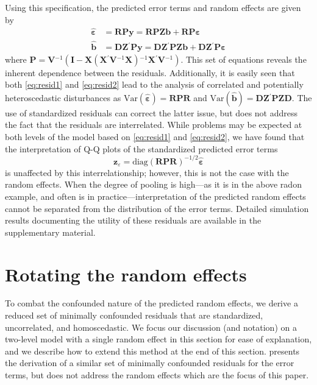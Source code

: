 \documentclass[12pt]{article} %
\newcommand{\hh}[1]{{\color{orange} #1}}
\newcommand{\al}[1]{{\color{red} #1}}
\newcommand{\inv}{\ensuremath{^{-1}}}
\newcommand{\trans}{\ensuremath{^\prime}}
\newcommand{\var}{\ensuremath{\mathrm{Var}}}
\begin{document}
Using this specification, the predicted error terms and random effects are given by 
%
\begin{align}
\widehat{\bm{\varepsilon}} &= \bm{RPy} = \bm{RPZb} + \bm{RP \varepsilon} \label{eq:resid1}\\
\widehat{\bm{b}} &= \bm{DZ}\trans \bm{Py} = \bm{DZ}\trans \bm{PZb} + \bm{DZ}\trans \bm{P \varepsilon} \label{eq:resid2}
\end{align}
%
where $\bm{P} = \bm{V}\inv( \bm{I} - \bm{X} (\bm{X}\trans \bm{V}\inv \bm{X})\inv \bm{X}\trans \bm{V}\inv)$. This  set of equations %
reveals the inherent dependence between the residuals.
Additionally, it is easily seen that both \eqref{eq:resid1} and \eqref{eq:resid2} lead to the analysis of correlated and potentially heteroscedastic disturbances as $\var(\widehat{\bm{\varepsilon}}) = \bm{RPR}$ and $\var(\widehat{\bm{b}}) = \bm{DZ}\trans \bm{PZD}$.
\al{
The use of standardized residuals can correct the latter issue, but does not address the fact that the residuals are interrelated. While problems may be expected at both levels of the model based on \eqref{eq:resid1} and \eqref{eq:resid2}, we have found that the interpretation of Q-Q plots of the standardized predicted error terms
%
\[
\bm{z}_{\varepsilon} =  \text{diag} \left(\bm{RPR} \right)^{-1/2} \widehat{\bm{\varepsilon}}
\]
%
is unaffected by this interrelationship; however, this is not the case with the random effects.  When the degree of pooling is high---as it is in the above radon example, and often is in practice---interpretation of the predicted random effects cannot be separated from the distribution of the error terms. Detailed simulation results \hh{documenting} the utility of  these residuals are available in the supplementary material.
}


\section{Rotating the random effects}\label{sec:rotate}

To combat \al{the confounded nature of the predicted random effects}, we derive a reduced set of minimally confounded residuals that are standardized, uncorrelated, and homoscedastic. \al{We focus our discussion (and notation) on a two-level model with a single random effect in this section for ease of explanation, and we describe how to extend this method at the end of this section.} \cite{HildenMinton:1995wh} presents the derivation of a similar set of minimally confounded residuals for the error terms, but does not address the random effects which are the focus of this paper. 
\end{document}

